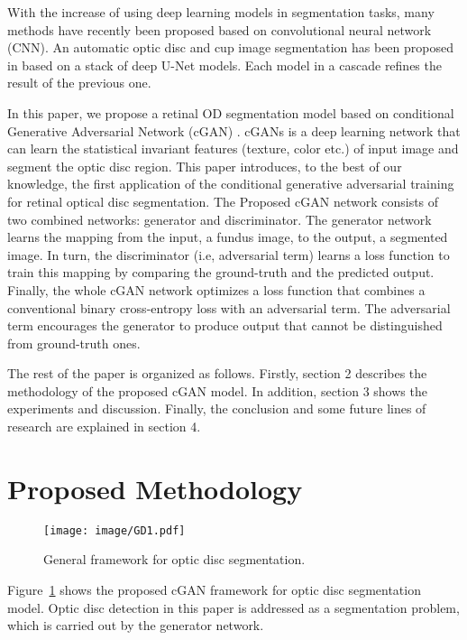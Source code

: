 \documentclass{IOS-Book-Article}
\begin{document}
With the increase of using deep learning models in segmentation tasks, many methods have recently been proposed based on  convolutional neural network (CNN). An automatic optic disc and cup image segmentation has been proposed in \cite{al2018multiscale} based on a stack of deep U-Net models. Each model in a cascade refines the result of the previous one. 

In this paper, we propose a retinal OD segmentation model based on conditional Generative Adversarial Network (cGAN) \cite{isola2017image}. cGANs is a deep learning network that can learn the statistical invariant features (texture, color etc.) of input image and segment the optic disc region. This paper introduces, to the best of our knowledge, the first application of the  conditional generative adversarial training for retinal optical disc segmentation. The Proposed cGAN network consists of two combined networks: generator and discriminator. The generator network learns the mapping from the input, a fundus image, to the output, a segmented image. In turn, the discriminator (i.e, adversarial term) learns a loss function to train this mapping by comparing the ground-truth and the predicted output. Finally, the whole cGAN network optimizes a loss function that combines a conventional binary cross-entropy loss with an adversarial term. The adversarial term encourages the generator to produce output that cannot be distinguished from ground-truth ones.

The rest of the paper is organized as follows. Firstly, section 2 describes the methodology of the proposed cGAN model. In addition, section 3 shows the experiments and discussion. Finally, the conclusion and some future lines of research are explained in section 4.

\section{Proposed Methodology}

\begin{figure}[htp]
\centering
\texttt{[image: image/GD1.pdf]}
\caption{General framework for optic disc segmentation.}
\label{fig:figmodel}
\end{figure}

Figure~\ref{fig:figmodel} shows the proposed cGAN framework for optic disc segmentation model. Optic disc detection in this paper is addressed as a segmentation problem, which is carried out by the generator network. 
\end{document}
